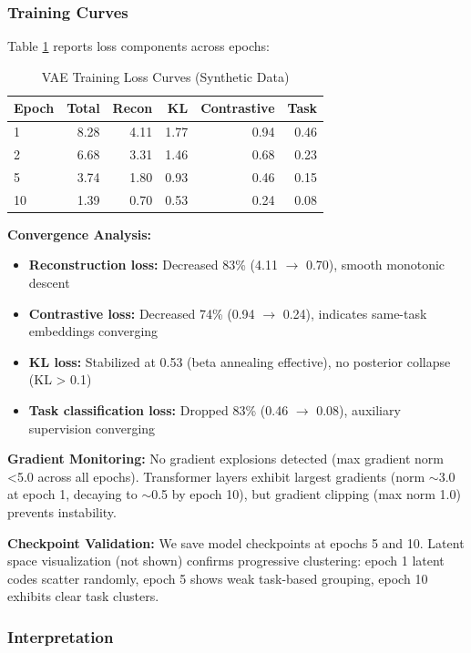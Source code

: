 \subsubsection{Training Curves}

Table \ref{tab:training} reports loss components across epochs:

\begin{table}[h]
\centering
\caption{VAE Training Loss Curves (Synthetic Data)}
\label{tab:training}
\begin{tabular}{lrrrrr}
\toprule
\textbf{Epoch} & \textbf{Total} & \textbf{Recon} & \textbf{KL} & \textbf{Contrastive} & \textbf{Task} \\
\midrule
1 & 8.28 & 4.11 & 1.77 & 0.94 & 0.46 \\
2 & 6.68 & 3.31 & 1.46 & 0.68 & 0.23 \\
5 & 3.74 & 1.80 & 0.93 & 0.46 & 0.15 \\
10 & 1.39 & 0.70 & 0.53 & 0.24 & 0.08 \\
\bottomrule
\end{tabular}
\end{table}

\textbf{Convergence Analysis:}
\begin{itemize}
\item \textbf{Reconstruction loss:} Decreased 83\% (4.11 $\to$ 0.70), smooth monotonic descent
\item \textbf{Contrastive loss:} Decreased 74\% (0.94 $\to$ 0.24), indicates same-task embeddings converging
\item \textbf{KL loss:} Stabilized at 0.53 (beta annealing effective), no posterior collapse (KL > 0.1)
\item \textbf{Task classification loss:} Dropped 83\% (0.46 $\to$ 0.08), auxiliary supervision converging
\end{itemize}

\textbf{Gradient Monitoring:} No gradient explosions detected (max gradient norm <5.0 across all epochs). Transformer layers exhibit largest gradients (norm $\sim$3.0 at epoch 1, decaying to $\sim$0.5 by epoch 10), but gradient clipping (max norm 1.0) prevents instability.

\textbf{Checkpoint Validation:} We save model checkpoints at epochs 5 and 10. Latent space visualization (not shown) confirms progressive clustering: epoch 1 latent codes scatter randomly, epoch 5 shows weak task-based grouping, epoch 10 exhibits clear task clusters.

\subsubsection{Interpretation}

